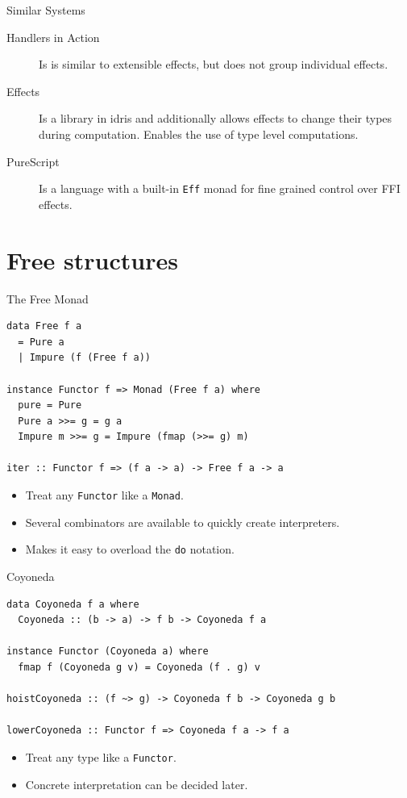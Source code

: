 \documentclass[aspectratio=169]{beamer}
\begin{document}
\begin{frame}{Similar Systems}
  \begin{description}
  \item[Handlers in Action] Is is similar to extensible effects, but does not
    group individual effects. \cite{hia}
  \item[Effects] Is a library in idris and additionally allows effects to change
    their types during computation. Enables the use of type level
    computations.~\cite{algebraic-effects-idris}
  \item[PureScript] Is a language with a built-in \texttt{Eff} monad for fine
    grained control over FFI effects.
  \end{description}
\end{frame}

\section{Free structures}

\begin{frame}[fragile]{The Free Monad}
  \begin{lstlisting}
data Free f a
  = Pure a
  | Impure (f (Free f a))

instance Functor f => Monad (Free f a) where
  pure = Pure
  Pure a >>= g = g a
  Impure m >>= g = Impure (fmap (>>= g) m)

iter :: Functor f => (f a -> a) -> Free f a -> a
  \end{lstlisting}
  \begin{itemize}
  \item Treat any \texttt{Functor} like a \texttt{Monad}.
  \item Several combinators are available to quickly create interpreters.
  \item Makes it easy to overload the \texttt{do} notation.
  \end{itemize}
\end{frame}

\begin{frame}[fragile]{Coyoneda}
  \begin{lstlisting}
data Coyoneda f a where
  Coyoneda :: (b -> a) -> f b -> Coyoneda f a

instance Functor (Coyoneda a) where
  fmap f (Coyoneda g v) = Coyoneda (f . g) v

hoistCoyoneda :: (f ~> g) -> Coyoneda f b -> Coyoneda g b

lowerCoyoneda :: Functor f => Coyoneda f a -> f a
  \end{lstlisting}
  \begin{itemize}
  \item Treat any type like a \texttt{Functor}.
  \item Concrete interpretation can be decided later.
  \end{itemize}
\end{frame}
\end{document}
